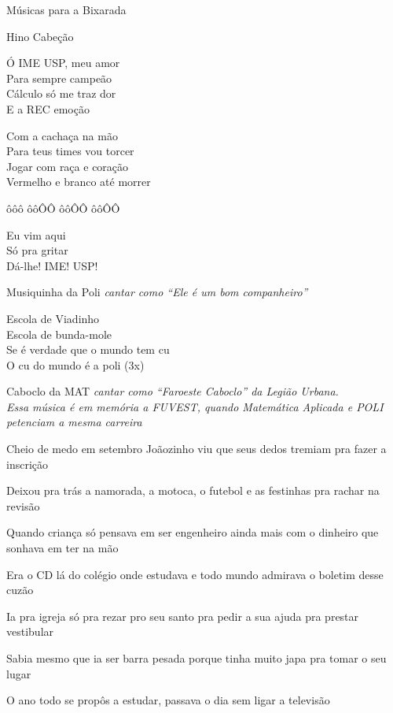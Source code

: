 \begin{secao}{Músicas para a Bixarada}

\begin{subsecao}{Hino Cabeção}

Ó IME USP, meu amor\\
Para sempre campeão\\
Cálculo só me traz dor\\
E a REC emoção

Com a cachaça na mão\\
Para teus times vou torcer\\
Jogar com raça e coração\\
Vermelho e branco até morrer

ôôô ôôÔÔ ôôÔÔ ôôÔÔ

Eu vim aqui\\
Só pra gritar\\
Dá-lhe! IME! USP!
\end{subsecao}

\begin{subsecao}{Musiquinha da Poli}
{\em cantar como ``Ele é um bom companheiro''}

Escola de Viadinho \\
Escola de bunda-mole \\
Se é verdade que o mundo tem cu \\
O cu do mundo é a poli  (3x)
\end{subsecao}

\begin{subsecao}{Caboclo da MAT}
{\em cantar como ``Faroeste Caboclo'' da Legião Urbana.}\\
{\em Essa música é em memória a FUVEST, quando Matemática Aplicada e POLI 
petenciam a mesma carreira}

Cheio de medo em setembro Joãozinho viu que seus dedos tremiam pra fazer a
inscrição

Deixou pra trás a namorada, a motoca, o futebol e as festinhas pra rachar na
revisão

Quando criança só pensava em ser engenheiro ainda mais com o dinheiro que
sonhava em ter na mão

Era o CD lá do colégio onde estudava e todo mundo admirava o boletim desse
cuzão

Ia pra igreja só pra rezar pro seu santo pra pedir a sua ajuda pra prestar
vestibular

Sabia mesmo que ia ser barra pesada porque tinha muito japa pra tomar o seu
lugar

O ano todo se propôs a estudar, passava o dia sem ligar a televisão


\end{subsecao}
\end{secao}
